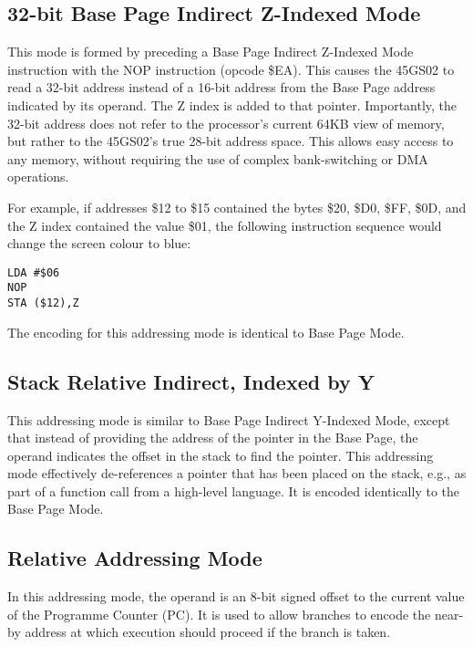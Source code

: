 \subsection{32-bit Base Page Indirect Z-Indexed Mode}

This mode is formed by preceding a Base Page Indirect Z-Indexed Mode instruction with
the {NOP} instruction (opcode \$EA).  This causes the 45GS02 to read a 32-bit address instead
of a 16-bit address from the Base Page address indicated by its operand.  The Z index is added
to that pointer.  Importantly, the 32-bit address does not refer to the processor's current 64KB
view of memory, but rather to the 45GS02's true 28-bit address space. This allows easy access
to any memory, without requiring the use of complex bank-switching or DMA operations.

For example, if addresses \$12 to \$15 contained the bytes \$20, \$D0, \$FF, \$0D, and the
Z index contained the value \$01, the following instruction sequence would change the screen
colour to blue:

\begin{tcolorbox}[colback=black,coltext=white]
\verbatimfont{\codefont}
\begin{verbatim}
LDA #$06
NOP
STA ($12),Z
\end{verbatim}
\end{tcolorbox}

The encoding for this addressing mode is identical to Base Page Mode.

\subsection{Stack Relative Indirect, Indexed by Y}

This addressing mode is similar to Base Page Indirect Y-Indexed Mode,
except that instead of providing the address of the pointer in the
Base Page, the operand indicates the offset in the stack to find the
pointer. This addressing mode effectively de-references a pointer that
has been placed on the stack, e.g., as part of a function call from a
high-level language.  It is encoded identically to the Base Page Mode.

\subsection{Relative Addressing Mode}

In this addressing mode, the operand is an 8-bit signed offset to the
current value of the Programme Counter (PC). It is used to allow branches
to encode the near-by address at which execution should proceed if the
branch is taken.

